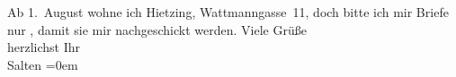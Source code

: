 \begin{ledgroupsized}[t]{13cm}
               Ab 1. August wohne ich Hietzing, Wattmanngasse 11, doch bitte ich mir Briefe nur \label{K_L03280-3v}\label{K_L03280-3h}, damit sie mir nachgeschickt werden.\pend
           \pstart
           {\pb}Viele Grüße {\\[\baselineskip]}herzlichst Ihr {\\[\baselineskip]}\spacefill\mbox{Salten}\pend
           \leftskip=0em{}
         
         \endnumbering{}\end{ledgroupsized}  \newcommand{\dateiname}{L03280}\newcommand{\titel}{Felix Salten an Arthur Schnitzler, 30. 7. 1898}\newcommand{\editorInnen}{Martin Anton Müller und Laura Untner}
      